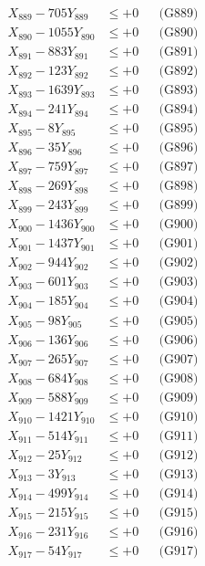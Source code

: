 \documentclass[a4paper,10pt]{article}
\begin{document}
{\begin{align}
X_{889} - 705Y_{889} &\leq +0 && \text{(G889)} \\
X_{890} - 1055Y_{890} &\leq +0 && \text{(G890)} \\
\allowbreak
X_{891} - 883Y_{891} &\leq +0 && \text{(G891)} \\
X_{892} - 123Y_{892} &\leq +0 && \text{(G892)} \\
X_{893} - 1639Y_{893} &\leq +0 && \text{(G893)} \\
X_{894} - 241Y_{894} &\leq +0 && \text{(G894)} \\
X_{895} - 8Y_{895} &\leq +0 && \text{(G895)} \\
X_{896} - 35Y_{896} &\leq +0 && \text{(G896)} \\
X_{897} - 759Y_{897} &\leq +0 && \text{(G897)} \\
X_{898} - 269Y_{898} &\leq +0 && \text{(G898)} \\
X_{899} - 243Y_{899} &\leq +0 && \text{(G899)} \\
X_{900} - 1436Y_{900} &\leq +0 && \text{(G900)} \\
\allowbreak
X_{901} - 1437Y_{901} &\leq +0 && \text{(G901)} \\
X_{902} - 944Y_{902} &\leq +0 && \text{(G902)} \\
X_{903} - 601Y_{903} &\leq +0 && \text{(G903)} \\
X_{904} - 185Y_{904} &\leq +0 && \text{(G904)} \\
X_{905} - 98Y_{905} &\leq +0 && \text{(G905)} \\
X_{906} - 136Y_{906} &\leq +0 && \text{(G906)} \\
X_{907} - 265Y_{907} &\leq +0 && \text{(G907)} \\
X_{908} - 684Y_{908} &\leq +0 && \text{(G908)} \\
X_{909} - 588Y_{909} &\leq +0 && \text{(G909)} \\
X_{910} - 1421Y_{910} &\leq +0 && \text{(G910)} \\
\allowbreak
X_{911} - 514Y_{911} &\leq +0 && \text{(G911)} \\
X_{912} - 25Y_{912} &\leq +0 && \text{(G912)} \\
X_{913} - 3Y_{913} &\leq +0 && \text{(G913)} \\
X_{914} - 499Y_{914} &\leq +0 && \text{(G914)} \\
X_{915} - 215Y_{915} &\leq +0 && \text{(G915)} \\
X_{916} - 231Y_{916} &\leq +0 && \text{(G916)} \\
X_{917} - 54Y_{917} &\leq +0 && \text{(G917)} \\

\end{align}}
\end{document}
